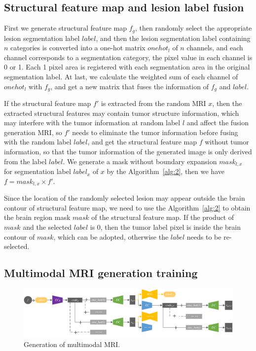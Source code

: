 \documentclass[letterpaper]{article} %
\begin{document}
\subsection{Structural feature map and lesion label fusion}

First we generate structural feature map $f_g$, then randomly select the appropriate lesion segmentation label $label$, and then the lesion segmentation label containing $n$ categories is converted into a one-hot matrix $onehot_l$ of $n$ channels, and each channel corresponds to a segmentation category, the pixel value in each channel is 0 or 1. Each 1 pixel area is registered with each segmentation area in the original segmentation label. At last, we calculate the weighted sum of each channel of $onehot_l$ with $f_g$, and get a new matrix that fuses the information of $f_g$ and $label$.

If the structural feature map $f'$ is extracted from the random MRI $x$, then the extracted structural features may contain tumor structure information, which may interfere with the tumor information at random label $l$ and affect the fusion generation MRI, so $f'$ needs to eliminate the tumor information before fusing with the random label $label$, and get the structural feature map $f$ without tumor information, so that the tumor information of the generated image is only derived from the label $label$. We generate a mask without boundary expansion $mask_{l,x}$ for segmentation label $label_x$ of $x$ by the Algorithm~\ref{alg:2}, then we have $f=mask_{l,x}\times f'$.

Since the location of the randomly selected lesion may appear outside the brain contour of structural feature map, we need to use the Algorithm~\ref{alg:2} to obtain the brain region mask $mask$ of the structural feature map. If the product of $mask$ and the selected $label$ is 0, then the tumor label pixel is inside the brain contour of $mask$, which can be adopted, otherwise the $label$ needs to be re-selected.

\subsection{Multimodal MRI generation training}
\begin{figure}
	\centering
	\includegraphics[width=0.98\columnwidth]{figures/mm_mri_generate}
	\caption{Generation of multimodal MRI.}
	\label{mm_mri_generate}
\end{figure}
\end{document}
